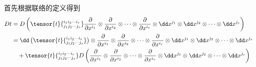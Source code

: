 首先根据联络的定义得到
\[
\begin{split}
Dt&=D\left(\tensor{t}{^{i_{1}i_{2}\cdots i_{r}}_{j_{1}j_{2}\cdots j_{s}}}\frac { \partial } { \partial x ^ { i_{1} } }\otimes\frac { \partial } { \partial x ^ { i_{2} } }\otimes\cdots\otimes\frac { \partial } { \partial x ^ { i_{r} } }\otimes\dd x^{j_{1}}\otimes\dd x^{j_{2}}\otimes\cdots\otimes\dd x^{j_{s}} \right)\\
&=\dd \left(\tensor{t}{^{i_{1}i_{2}\cdots i_{r}}_{j_{1}j_{2}\cdots j_{s}}}\right) \otimes \frac { \partial } { \partial x ^ { i_{1} } }\otimes\frac { \partial } { \partial x ^ { i_{2} } }\otimes\cdots\otimes\frac { \partial } { \partial x ^ { i_{r} } }\otimes\dd x^{j_{1}}\otimes\dd x^{j_{2}}\otimes\cdots\otimes\dd x^{j_{s}} \\
&\quad+\tensor{t}{^{i_{1}i_{2}\cdots i_{r}}_{j_{1}j_{2}\cdots j_{s}}}D\left(\frac { \partial } { \partial x ^ { i_{1} } }\otimes\frac { \partial } { \partial x ^ { i_{2} } }\otimes\cdots\otimes\frac { \partial } { \partial x ^ { i_{r} } }\otimes \dd x^{j_{1}}\otimes\dd x^{j_{2}}\otimes\cdots\otimes \dd x^{j_{s}}\right)
\end{split}
\]

